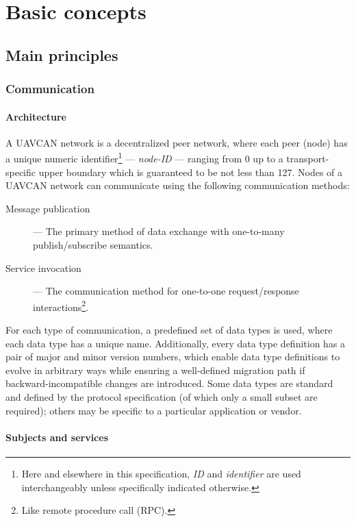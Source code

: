 \chapter{Basic concepts}\label{sec:basic}

\section{Main principles}

\subsection{Communication}

\subsubsection{Architecture}

A UAVCAN network is a decentralized peer network, where each peer (node) has a unique
numeric identifier\footnote{%
    Here and elsewhere in this specification, \emph{ID} and \emph{identifier} are used
    interchangeably unless specifically indicated otherwise.
} --- \emph{node-ID} --- ranging from 0 up to a transport-specific upper boundary which is guaranteed to be
not less than 127.
Nodes of a UAVCAN network can communicate using the following communication methods:

\begin{description}
    \item[Message publication] --- The primary method of data exchange with one-to-many publish/subscribe semantics.
    \item[Service invocation] --- The communication method for one-to-one request/response
         interactions\footnote{Like remote procedure call (RPC).}.
\end{description}

For each type of communication, a predefined set of data types is used,
where each data type has a unique name.
Additionally, every data type definition has a pair of major and minor version numbers,
which enable data type definitions to evolve in arbitrary ways while ensuring a well-defined
migration path if backward-incompatible changes are introduced.
Some data types are standard and defined by the protocol specification (of which only a small
subset are required); others may be specific to a particular application or vendor.

\subsubsection{Subjects and services}\label{sec:basic_subjects_and_services}

